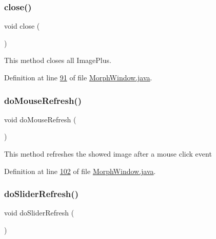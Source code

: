 \hypertarget{classgui_1_1_morph_window_a5ae591df94fc66ccb85cbb6565368bca}{}\label{classgui_1_1_morph_window_a5ae591df94fc66ccb85cbb6565368bca} 
\subsubsection{\texorpdfstring{close()}{close()}}
{\footnotesize\ttfamily void close (\begin{DoxyParamCaption}{ }\end{DoxyParamCaption})}

This method closes all Image\+Plus. 

Definition at line \hyperlink{_morph_window_8java_source_l00091}{91} of file \hyperlink{_morph_window_8java_source}{Morph\+Window.\+java}.

\hypertarget{classgui_1_1_morph_window_a5f99d67f201dbf538b692337cd3af654}{}\label{classgui_1_1_morph_window_a5f99d67f201dbf538b692337cd3af654} 
\subsubsection{\texorpdfstring{do\+Mouse\+Refresh()}{doMouseRefresh()}}
{\footnotesize\ttfamily void do\+Mouse\+Refresh (\begin{DoxyParamCaption}{ }\end{DoxyParamCaption})\hspace{0.3cm}{\ttfamily [private]}}

This method refreshes the showed image after a mouse click event 

Definition at line \hyperlink{_morph_window_8java_source_l00102}{102} of file \hyperlink{_morph_window_8java_source}{Morph\+Window.\+java}.

\hypertarget{classgui_1_1_morph_window_a7db6c32207f03c20a1b7932a5f804435}{}\label{classgui_1_1_morph_window_a7db6c32207f03c20a1b7932a5f804435} 
\subsubsection{\texorpdfstring{do\+Slider\+Refresh()}{doSliderRefresh()}}
{\footnotesize\ttfamily void do\+Slider\+Refresh (\begin{DoxyParamCaption}{ }\end{DoxyParamCaption})\hspace{0.3cm}{\ttfamily [private]}}

